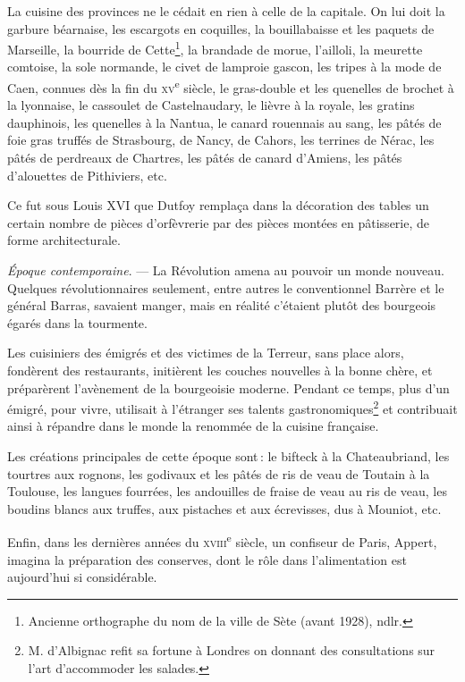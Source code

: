 La cuisine des provinces ne le cédait en rien à celle de la capitale. On lui
doit la garbure béarnaise, les escargots en coquilles, la bouillabaisse et les
paquets de Marseille, la bourride de Cette\footnote{Ancienne
orthographe du nom de la ville de Sète (avant 1928), ndlr.}, la brandade de morue,
l'ailloli, la meurette comtoise, la sole normande, le civet de lamproie gascon,
les tripes à la mode de Caen, connues dès la fin du
\textsc{xv}\textsuperscript{e} siècle, le gras-double et les quenelles de
brochet à la lyonnaise, le cassoulet de Castelnaudary, le lièvre à la royale,
les gratins dauphinois, les quenelles à la Nantua, le canard rouennais au sang,
les pâtés de foie gras truffés de Strasbourg, de Nancy, de Cahors, les terrines
de Nérac, les pâtés de perdreaux de Chartres, les pâtés de canard d'Amiens, les
pâtés d'alouettes de Pithiviers, etc.

Ce fut sous Louis XVI que Dutfoy remplaça dans la décoration des tables un
certain nombre de pièces d’orfèvrerie par des pièces montées en pâtisserie, de
forme architecturale.

\sk

\textit{Époque contemporaine}. — La Révolution amena au pouvoir un monde
nouveau. Quelques révolutionnaires seulement, entre autres le conventionnel
Barrère et le général Barras, savaient manger, mais en réalité c'étaient plutôt
des bourgeois égarés dans la tourmente.

Les cuisiniers des émigrés et des victimes de la Terreur, sans place alors,
fondèrent des restaurants, initièrent les couches nouvelles à la bonne chère,
et préparèrent l'avènement de la bourgeoisie moderne. Pendant ce temps, plus
d'un émigré, pour vivre, utilisait à l'étranger ses talents
gastronomiques\footnote{M. d'Albignac refit sa fortune à Londres on donnant des
consultations sur l’art d'accommoder les salades.} et contribuait ainsi
à répandre dans le monde la renommée de la cuisine française.

Les créations principales de cette époque sont : le bifteck à la Chateaubriand,
les tourtres aux rognons, les godivaux et les pâtés de ris de veau de Toutain à la
Toulouse, les langues fourrées, les andouilles de fraise de veau au ris de veau, les
boudins blancs aux truffes, aux pistaches et aux écrevisses, dus à Mouniot, etc.

Enfin, dans les dernières années du \textsc{xviii}\textsuperscript{e} siècle,
un confiseur de Paris, Appert, imagina la préparation des conserves, dont le
rôle dans l'alimentation est aujourd'hui si considérable.

